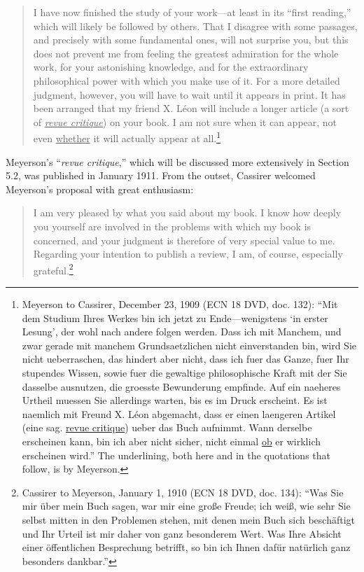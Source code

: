 \begin{quote}
I have now finished the study of your work---at least in its ``first reading,'' which will likely be followed by others. That I disagree with some passages, and precisely with some fundamental ones, will not surprise you, but this does not prevent me from feeling the greatest admiration for the whole work, for your astonishing knowledge, and for the extraordinary philosophical power with which you make use of it. For a more detailed judgment, however, you will have to wait until it appears in print. It has been arranged that my friend X. Léon will include a longer article (a sort of \emph{\underline{revue critique}}) on your book. I am not sure when it can appear, not even \underline{whether} it will actually appear at all.\footnote{Meyerson to Cassirer, December 23, 1909 (ECN 18 DVD, doc. 132): ``Mit dem Studium Ihres Werkes bin ich jetzt zu Ende---wenigstens `in erster Lesung', der wohl nach andere folgen werden. Dass ich mit Manchem, und zwar gerade mit manchem Grundsaetzlichen nicht einverstanden bin, wird Sie nicht ueberraschen, das hindert aber nicht, dass ich fuer das Ganze, fuer Ihr stupendes Wissen, sowie fuer die gewaltige philosophische Kraft mit der Sie dasselbe ausnutzen, die groesste Bewunderung empfinde. Auf ein naeheres Urtheil muessen Sie allerdings warten, bis es im Druck erscheint. Es ist naemlich mit Freund X. Léon abgemacht, dass er einen laengeren Artikel (eine sag. \underline{revue critique}) ueber das Buch aufnimmt. Wann derselbe erscheinen kann, bin ich aber nicht sicher, nicht einmal \underline{ob} er wirklich erscheinen wird.'' The underlining, both here and in the quotations that follow, is by Meyerson.}
\end{quote}

Meyerson's ``\emph{revue critique},'' which will be discussed more extensively in Section 5.2, was published in January 1911. From the outset, Cassirer welcomed Meyerson's proposal with great enthusiasm:

\begin{quote}
I am very pleased by what you said about my book. I know how deeply you yourself are involved in the problems with which my book is concerned, and your judgment is therefore of very special value to me. Regarding your intention to publish a review, I am, of course, especially grateful.\footnote{Cassirer to Meyerson, January 1, 1910 (ECN 18 DVD, doc. 134): ``Was Sie mir über mein Buch sagen, war mir eine große Freude; ich weiß, wie sehr Sie selbst mitten in den Problemen stehen, mit denen mein Buch sich beschäftigt und Ihr Urteil ist mir daher von ganz besonderem Wert. Was Ihre Absicht einer öffentlichen Besprechung betrifft, so bin ich Ihnen dafür natürlich ganz besonders dankbar.''}
\end{quote}

